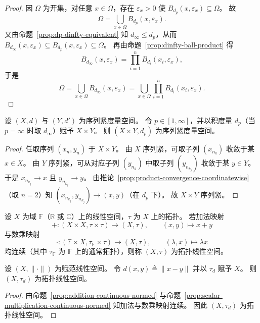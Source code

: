 \documentclass[lang=cn,a4paper,newtx,section]{elegantbook}
\begin{document}
\begin{proof}
  因 $\Omega$ 为开集，对任意 $x\in\Omega$，存在 $\varepsilon_x>0$ 使 $B_{d_p}(x,\varepsilon_x)\subseteq\Omega$。
  故
  \[
    \Omega=\bigcup_{x\in\Omega}B_{d_p}(x,\varepsilon_x).
  \]
  又由命题~\ref{prop:dp-dinfty-equivalent} 知 $d_\infty\le d_p$，从而 $B_{d_\infty}(x,\varepsilon_x)\subseteq B_{d_p}(x,\varepsilon_x)\subseteq\Omega$。
  再由命题~\ref{prop:dinfty-ball-product} 得
  \[
    B_{d_\infty}(x,\varepsilon_x)=\prod_{i=1}^{n}B_{d_i}(x_i,\varepsilon_x),
  \]
  于是
  \[
    \Omega=\bigcup_{x\in\Omega}B_{d_\infty}(x,\varepsilon_x)=\bigcup_{x\in\Omega}\prod_{i=1}^{n}B_{d_i}(x_i,\varepsilon_x).
  \]
\end{proof}

\begin{proposition}\label{prop:product-sequentially-compact-two}
  设 $(X,d)$ 与 $(Y,d')$ 为序列紧度量空间。
  令 $p\in[1,\infty]$，并以积度量 $d_p$（当 $p=\infty$ 时取 $d_\infty$）赋予 $X\times Y$。
  则 $(X\times Y,d_p)$ 为序列紧度量空间。
\end{proposition}

\begin{proof}
  任取序列 $(x_n,y_n)$ 于 $X\times Y$。
  由 $X$ 序列紧，可取子列 $(x_{n_k})$ 收敛于某 $x\in X$。
  由 $Y$ 序列紧，可从对应子列 $(y_{n_k})$ 中取子列 $(y_{n_{k_j}})$ 收敛于某 $y\in Y$。
  于是 $x_{n_{k_j}}\to x$ 且 $y_{n_{k_j}}\to y$。
  由推论~\ref{prop:product-convergence-coordinatewise}（取 $n=2$）知 $(x_{n_{k_j}},y_{n_{k_j}})\to(x,y)$（在 $d_p$ 下）。
  故 $X\times Y$ 序列紧。
\end{proof}

\begin{definition}
  设 $X$ 为域 $\mathbb{F}$（$\mathbb{R}$ 或 $\mathbb{C}$）上的线性空间，$\tau$ 为 $X$ 上的拓扑。
  若加法映射
  \[
    +:(X\times X,\tau\times\tau)\to(X,\tau),\qquad (x,y)\mapsto x+y
  \]
  与数乘映射
  \[
    \cdot:(\mathbb{F}\times X,\tau_{\mathbb{F}}\times\tau)\to(X,\tau),\qquad (\lambda,x)\mapsto \lambda x
  \]
  均连续（其中 $\tau_{\mathbb{F}}$ 为 $\mathbb{F}$ 上的通常拓扑），则称 $(X,\tau)$ 为拓扑线性空间。
\end{definition}

\begin{corollary}
  设 $(X,\|\cdot\|)$ 为赋范线性空间。
  令 $d(x,y)\triangleq\|x-y\|$ 并以 $\tau_d$ 赋予 $X$。
  则 $(X,\tau_d)$ 为拓扑线性空间。
\end{corollary}

\begin{proof}
  由命题~\ref{prop:addition-continuous-normed} 与命题~\ref{prop:scalar-multiplication-continuous-normed} 知加法与数乘映射连续。
  因此 $(X,\tau_d)$ 为拓扑线性空间。
\end{proof}
\end{document}
